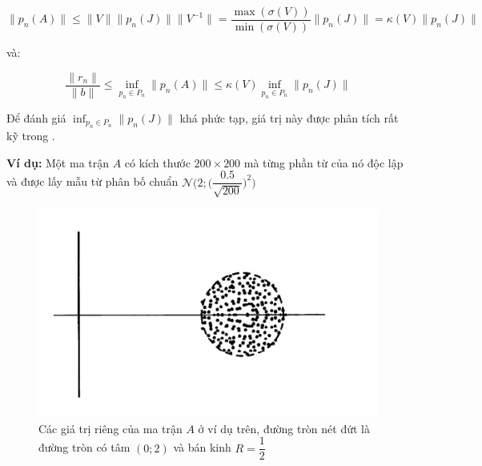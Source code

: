 \documentclass[14pt, a4paper]{article}
\numberwithin{equation}{section}
\numberwithin{algorithm}{section}
\numberwithin{figure}{section}
\numberwithin{dl}{section}
\numberwithin{md}{section}
\numberwithin{bd}{section}
\numberwithin{dn}{section}
\begin{document}
\begin{equation}
    \lVert p_n(A) \rVert \leq \lVert V \rVert \lVert p_n(J) \rVert \lVert V^{-1} \rVert=\dfrac{\max(\sigma(V))}{\min(\sigma(V))} \lVert p_n(J) \rVert = \kappa(V) \lVert p_n(J) \rVert
\end{equation}

và:

\begin{equation}
    \dfrac{\lVert r_n \rVert}{\lVert b \rVert} \leq \inf_{p_n \in P_n} \lVert p_n(A) \rVert \leq \kappa(V) \inf_{p_n \in P_n} \lVert p_n(J) \rVert
\end{equation}

Để đánh giá $\inf_{p_n \in P_n} \lVert p_n(J) \rVert$ khá phức tạp, giá trị này được phân tích rất kỹ trong \cite{tichy2005worst}.

\textbf{Ví dụ:} Một ma trận $A$ có kích thước $200\times 200$ mà từng phần từ của nó độc lập và được lấy mẫu từ phân bố chuẩn $\mathcal{N}\Bigg(2;\Big(\dfrac{0.5}{\sqrt{200}} \Big)^2 \Bigg)$

\begin{figure}[h!] \centering

    \includegraphics[scale=1.0]{A-Eigenvalues.jpg}
    \caption{Các giá trị riêng của ma trận $A$ ở ví dụ trên, đường tròn nét đứt là đường tròn có tâm $(0; 2)$ và bán kinh $R=\dfrac{1}{2}$ \cite{trefethen1997numerical}}

    \label{fig:A-Eigenvalues}
\end{figure}
\end{document}
